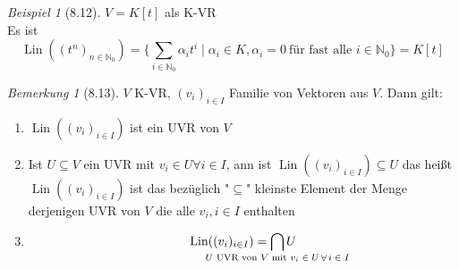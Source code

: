 \documentclass[a4paper]{scrartcl}
\DeclareMathOperator{\Forall}{\forall}
\DeclareMathOperator{\Lin}{Lin}
\theoremstyle{definition}
\theoremstyle{plain}
\theoremstyle{plain}
\theoremstyle{remark}
\newtheorem{remark}{Bemerkung}
\theoremstyle{remark}
\theoremstyle{remark}
\theoremstyle{remark}
\theoremstyle{remark}
\newtheorem{ex}{Beispiel}
\begin{document}
\begin{ex}[8.12]
$V = K[t]$ als K-VR \\
  Es ist \[\Lin((t^n)_{n\in\mathbb{N}_0}) = \{\sum_{i\in\mathbb{N}_0} \alpha_i t^i \mid \alpha_i \in K, \alpha_i = 0~\text{für fast alle $i\in \mathbb{N}_0$}\} = K[t]\]
\end{ex}
\begin{remark}[8.13]
$V$ K-VR, $(v_i)_{i\in I}$ Familie von Vektoren aus $V$. Dann gilt:
\begin{enumerate}
\item $\Lin((v_i)_{i\in I})$ ist ein UVR von $V$
\item Ist $U\subseteq V$ ein UVR mit $v_i \in U\Forall i\in I$, ann ist $\Lin((v_i)_{i\in I}) \subseteq U$
     das heißt $\Lin((v_i)_{i\in I})$ ist das bezüglich "$\subseteq$" kleinste Element der Menge derjenigen UVR von $V$ die alle $v_i, i\in I$ enthalten
\item \[\Lin((v_i)_{i\in I}) = \bigcap_{\mathclap{\text{$U$ UVR von $V$ mit $v_i \in U \Forall i\in I$}}} U\]
\end{enumerate}
\end{remark}
\end{document}
